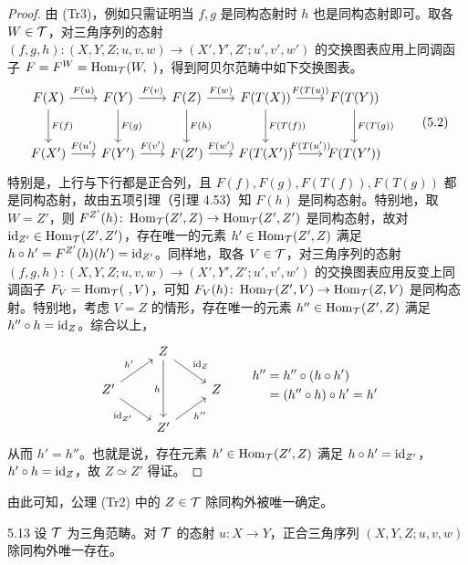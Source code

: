 \begin{proof}
由 (Tr3)，例如只需证明当 $f,g$ 是同构态射时 $h$ 也是同构态射即可。取各 $W\in\mathcal{T}$，对三角序列的态射 $(f,g,h)\colon(X,Y,Z;u,v,w)\to(X',Y',Z';u',v',w')$ 的交换图表应用上同调函子 $F=F^W=\Hom_{\cT}(W,\ )$，得到阿贝尔范畴中如下交换图表。
\begin{equation}
\begin{tikzcd}[row sep=2.6em, column sep=1.9em]
F(X) \arrow[r,"F(u)"] \arrow[d,"F(f)"] & F(Y) \arrow[r,"F(v)"] \arrow[d,"F(g)"] & F(Z) \arrow[r,"F(w)"] \arrow[d,"F(h)"] & F(T(X)) \arrow[r,"F(T(u))"] \arrow[d,"F(T(f))"] & F(T(Y)) \arrow[d,"F(T(g))"] \\
F(X') \arrow[r,"F(u')"] & F(Y') \arrow[r,"F(v')"] & F(Z') \arrow[r,"F(w')"] & F(T(X')) \arrow[r,"F(T(u'))"] & F(T(Y'))
\end{tikzcd} \tag{5.2}
\end{equation}
特别是，上行与下行都是正合列，且 $F(f),F(g),F(T(f)),F(T(g))$ 都是同构态射，故由五项引理（引理 4.53）知 $F(h)$ 是同构态射。特别地，取 $W=Z'$，则 $F^{Z'}(h)\colon\operatorname{Hom}_{\mathcal{T}}(Z',Z)\to\operatorname{Hom}_{\mathcal{T}}(Z',Z')$ 是同构态射，故对 $\mathrm{id}_{Z'}\in\operatorname{Hom}_{\mathcal{T}}(Z',Z')$，存在唯一的元素 $h'\in\operatorname{Hom}_{\mathcal{T}}(Z',Z)$ 满足 $h\circ h'=F^{Z'}(h)(h')=\mathrm{id}_{Z'}$。同样地，取各 $V\in\mathcal{T}$，对三角序列的态射 $(f,g,h)\colon(X,Y,Z;u,v,w)\to(X',Y',Z';u',v',w')$ 的交换图表应用反变上同调函子 $F_V=\Hom_{\cT}(\ ,V)$，可知 $F_V(h)\colon\operatorname{Hom}_{\mathcal{T}}(Z',V)\to\operatorname{Hom}_{\mathcal{T}}(Z,V)$ 是同构态射。特别地，考虑 $V=Z$ 的情形，存在唯一的元素 $h''\in\operatorname{Hom}_{\mathcal{T}}(Z',Z)$ 满足 $h''\circ h=\mathrm{id}_Z$。综合以上，
\[
\begin{tikzcd}[row sep=1.5em, column sep=2.4em]
{} & Z \arrow[dr,"\id_Z"] \arrow[dd,"h"'] & {} \\
Z' \arrow[ur,"h'"] \arrow[dr,"\id_{Z'}"'] & {} & Z \\
{} & Z' \arrow[ur,"h''"'] & {}
\end{tikzcd}
\qquad
\begin{aligned}
h'' &= h''\circ(h\circ h')\\
&= (h''\circ h)\circ h' = h'
\end{aligned}
\]
从而 $h'=h''$。也就是说，存在元素 $h'\in\operatorname{Hom}_{\mathcal{T}}(Z',Z)$ 满足 $h\circ h'=\mathrm{id}_{Z'}$，$h'\circ h=\mathrm{id}_Z$，故 $Z\simeq Z'$ 得证。
\end{proof}

由此可知，公理 (Tr2) 中的 $Z\in\mathcal{T}$ 除同构外被唯一确定。

\begin{corollary}{5.13}
设 $\mathcal{T}$ 为三角范畴。对 $\mathcal{T}$ 的态射 $u\colon X\to Y$，正合三角序列 $(X,Y,Z;u,v,w)$ 除同构外唯一存在。
\end{corollary}

